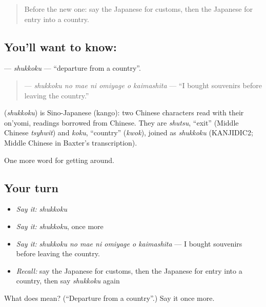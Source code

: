 \begin{quote}
Before the new one: say the Japanese for customs, then the Japanese for entry into a country.
\end{quote}

\subsection*{You'll want to know: }
\textbf{} — \emph{shukkoku} — \textquotedblleft{}departure from a country\textquotedblright{}.

\begin{quote}
\textbf{   } — \emph{shukkoku no mae ni omiyage o kaimashita} — \textquotedblleft{}I bought souvenirs before leaving the country.\textquotedblright{}
\end{quote}

\begin{cousinweb}
\textbf{} (\emph{shukkoku}) is Sino-Japanese (kango): two Chinese characters read with their on'yomi, readings borrowed from Chinese. They are \emph{shutsu}, \textquotedblleft{}exit\textquotedblright{} (Middle Chinese \emph{tsyhwit}) and \emph{koku}, \textquotedblleft{}country\textquotedblright{} (\emph{kwok}), joined as \emph{shukkoku} (KANJIDIC2; Middle Chinese in Baxter's transcription).
\end{cousinweb}

\begin{grammarlens}[title={What you've built}]
One more word for getting around.
\end{grammarlens}

\subsection*{Your turn}
\begin{itemize}
\raggedright
  \item \emph{Say it:} \emph{shukkoku}
  \item \emph{Say it:} \emph{shukkoku}, once more
  \item \emph{Say it:} \emph{shukkoku no mae ni omiyage o kaimashita} — I bought souvenirs before leaving the country.
  \item \emph{Recall:} say the Japanese for customs, then the Japanese for entry into a country, then say \emph{shukkoku} again
\end{itemize}

\begin{tcolorbox}[breakable,colback=teal!4,colframe=teal!35!black,title={Before you move on}]
What does  mean? (\textquotedblleft{}Departure from a country\textquotedblright{}.) Say it once more.
\end{tcolorbox}
